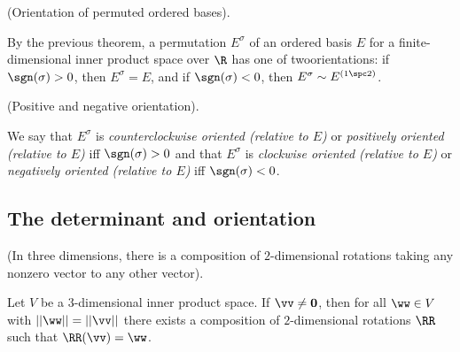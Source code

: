 \begin{theorem}
    (Orientation of permuted ordered bases).

    By the previous theorem, a permutation $E^\sigma$ of an ordered basis $E$ for a finite-dimensional inner product space over $\R$ has one of two\footnotemark orientations: if $\sgn(\sigma) > 0$, then $E^\sigma = E$, and if $\sgn(\sigma) < 0$, then $E^\sigma \sim E^{(1 \spc 2)}$.    
    
\end{theorem}

\begin{defn}
    (Positive and negative orientation).

    We say that $E^\sigma$ is \textit{counterclockwise oriented (relative to $E$)} or \textit{positively oriented (relative to $E$)} iff $\sgn(\sigma) > 0$ and that $E^\sigma$ is \textit{clockwise oriented (relative to $E$)} or \textit{negatively oriented (relative to $E$)} iff $\sgn(\sigma) < 0$.
\end{defn}

\subsection*{The determinant and orientation}

\begin{lemma}
    (In three dimensions, there is a composition of $2$-dimensional rotations taking any nonzero vector to any other vector).

    Let $V$ be a $3$-dimensional inner product space. If $\vv \neq \mathbf{0}$, then for all $\ww \in V$ with $||\ww|| = ||\vv||$ there exists a composition of $2$-dimensional rotations $\RR$ such that $\RR(\vv) = \ww$.
\end{lemma}

